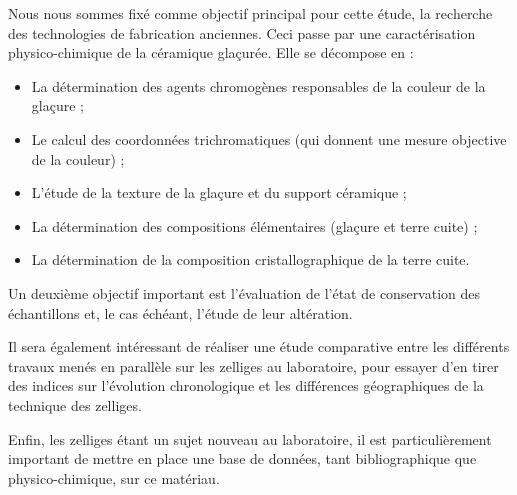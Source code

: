 Nous nous sommes fixé comme objectif principal pour cette étude, la 
recherche des technologies de fabrication anciennes. Ceci passe par 
une caractérisation physico-chimique de la céramique glaçurée. Elle 
se décompose en :

\begin{itemize}
\item La détermination des agents chromogènes responsables de la 
      couleur de la glaçure ;
\item Le calcul des coordonnées trichromatiques (qui donnent une 
      mesure objective de la couleur) ;
\item L'étude de la texture de la glaçure et du support céramique ;
\item La détermination des compositions élémentaires (glaçure et 
      terre cuite) ;
\item La détermination de la composition cristallographique de la 
      terre cuite.
\end{itemize}

Un deuxième objectif important est l'évaluation de l'état de 
conservation des échantillons et, le cas échéant, l'étude de leur 
altération.

Il sera également intéressant de réaliser une étude comparative 
entre les différents travaux menés en parallèle sur les zelliges au 
laboratoire, pour essayer d'en tirer des indices sur l'évolution 
chronologique et les différences géographiques de la technique des 
zelliges.

Enfin, les zelliges étant un sujet nouveau au laboratoire, il est 
particulièrement important de mettre en place une base de données, 
tant bibliographique que physico-chimique, sur ce matériau.
